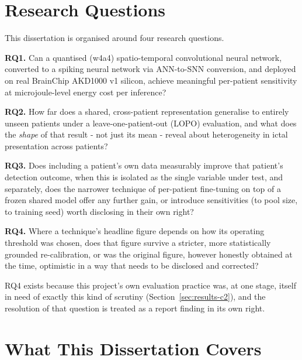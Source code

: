 \section{Research Questions}

This dissertation is organised around four research questions.

\textbf{RQ1.} Can a quantised (w4a4) spatio-temporal convolutional neural network, converted to a spiking neural network via ANN-to-SNN conversion, and deployed on real BrainChip 
AKD1000 v1 silicon, achieve meaningful per-patient sensitivity at microjoule-level energy cost per inference?

\textbf{RQ2.} How far does a shared, cross-patient representation generalise to entirely unseen patients under a leave-one-patient-out (LOPO) evaluation, and what does 
the \emph{shape} of that result - not just its mean - reveal about heterogeneity in ictal presentation across patients?

\textbf{RQ3.} Does including a patient's own data measurably improve that patient's detection outcome, when this is isolated as the single variable under test, and separately, 
does the narrower technique of per-patient fine-tuning on top of a frozen shared model offer any further gain, or introduce sensitivities (to pool size, to training seed) worth 
disclosing in their own right?

\textbf{RQ4.} Where a technique's headline figure depends on how its operating threshold was chosen, does that figure survive a stricter, more statistically grounded 
re-calibration, or was the original figure, however honestly obtained at the time, optimistic in a way that needs to be disclosed and corrected?

RQ4 exists because this project's own evaluation practice was, at one stage, itself in need of exactly this kind of scrutiny (Section~\ref{sec:results-c2}), and the resolution of that 
question is treated as a report finding in its own right.

\section{What This Dissertation Covers}

